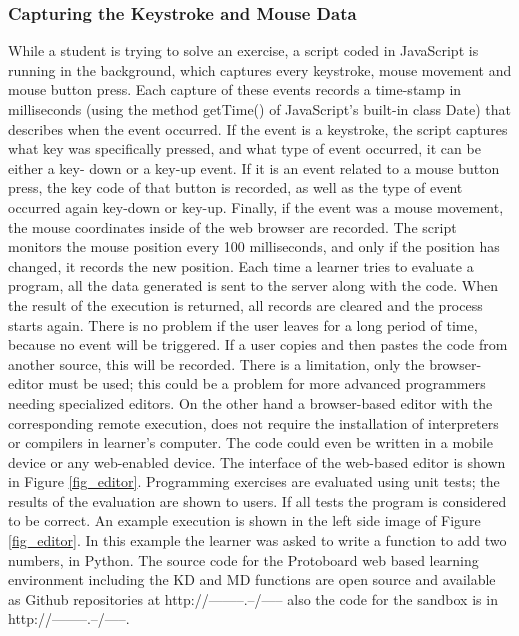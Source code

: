 \documentclass[a4paper]{llncs}
\begin{document}
\subsubsection{Capturing the Keystroke and Mouse Data} 
While a student is trying
to solve an exercise, a script coded in JavaScript is running in the background,
which captures every keystroke, mouse movement and mouse button press. Each
capture of these events records a time-stamp in milliseconds (using the method
getTime() of JavaScript's built-in class Date) that describes when the event
occurred. If the event is a keystroke, the script captures what key was
specifically pressed, and what type of event occurred, it can be either a key-
down or a key-up event. If it is an event related to a mouse button press, the
key code of that button is recorded, as well as the type of event occurred again
key-down or key-up. Finally, if the event was a mouse movement, the mouse
coordinates inside of the web browser are recorded. The script monitors the
mouse position every 100 milliseconds, and only if the position has changed, it
records the new position. Each time a learner tries to evaluate a program, all
the data generated is sent to the server along with the code. When the result of
the execution is returned, all records are cleared and the process starts again.
There is no problem if the user leaves for a long period of time, because no
event will be triggered. If a user copies and then pastes the code from another
source, this will be recorded. There is a limitation, only the browser-editor
must be used; this could be a problem for more advanced programmers needing
specialized editors.  On the other hand a browser-based editor with the
corresponding remote execution, does not require the installation of
interpreters or compilers in learner’s computer. The code could even be written
in a mobile device or any web-enabled device.  The interface of the web-based
editor is shown in Figure \ref{fig_editor}. Programming exercises are evaluated using unit
tests; the results of the evaluation are shown to users. If all tests the
program is considered to be correct. An example execution is shown in the left
side image of Figure \ref{fig_editor}. In this example the learner was asked to write a
function to add two numbers, in Python. The source code for the Protoboard web
based learning environment including the KD and MD functions are open source and
available as Github repositories at http://--------.--/----- also the code for the
sandbox is in http://--------.--/-----. %
\end{document}
